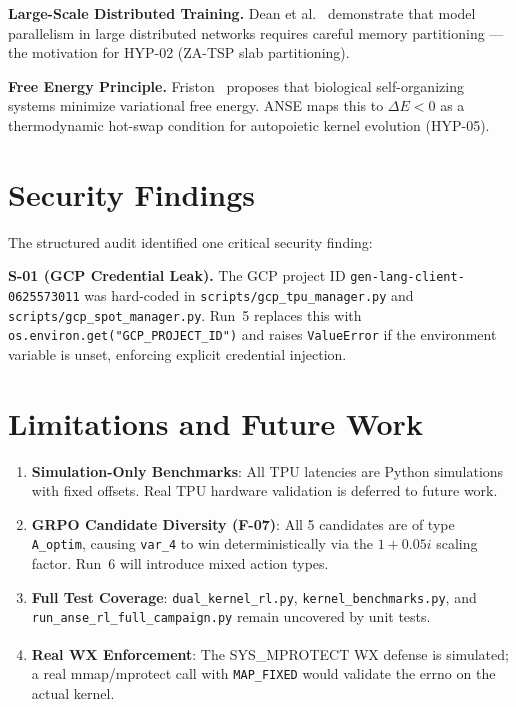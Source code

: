 \documentclass[10pt,twocolumn]{article}
\begin{document}
\textbf{Large-Scale Distributed Training.}
Dean et al.~\cite{dean2012large} demonstrate that model parallelism in large
distributed networks requires careful memory partitioning — the motivation
for HYP-02 (ZA-TSP slab partitioning).

\textbf{Free Energy Principle.}
Friston~\cite{friston2010free} proposes that biological self-organizing systems
minimize variational free energy. ANSE maps this to $\Delta E < 0$ as a
thermodynamic hot-swap condition for autopoietic kernel evolution (HYP-05).

\section{Security Findings}

The structured audit identified one critical security finding:

\textbf{S-01 (GCP Credential Leak).}
The GCP project ID \texttt{gen-lang-client-0625573011} was hard-coded
in \texttt{scripts/gcp\_tpu\_manager.py} and \texttt{scripts/gcp\_spot\_manager.py}.
Run~5 replaces this with \texttt{os.environ.get("GCP\_PROJECT\_ID")} and
raises \texttt{ValueError} if the environment variable is unset,
enforcing explicit credential injection.

\section{Limitations and Future Work}

\begin{enumerate}
  \item \textbf{Simulation-Only Benchmarks}: All TPU latencies are Python simulations
        with fixed offsets. Real TPU hardware validation is deferred to future work.
  \item \textbf{GRPO Candidate Diversity (F-07)}: All 5 candidates are of type \texttt{A\_optim},
        causing \texttt{var\_4} to win deterministically via the $1 + 0.05i$ scaling factor.
        Run~6 will introduce mixed action types.
  \item \textbf{Full Test Coverage}: \texttt{dual\_kernel\_rl.py}, \texttt{kernel\_benchmarks.py},
        and \texttt{run\_anse\_rl\_full\_campaign.py} remain uncovered by unit tests.
  \item \textbf{Real W\textsuperscript{$\hat{}$}X Enforcement}: The SYS\_MPROTECT
        W$\hat{}$X defense is simulated; a real mmap/mprotect call with
        \texttt{MAP\_FIXED} would validate the errno on the actual kernel.
\end{enumerate}
\end{document}
